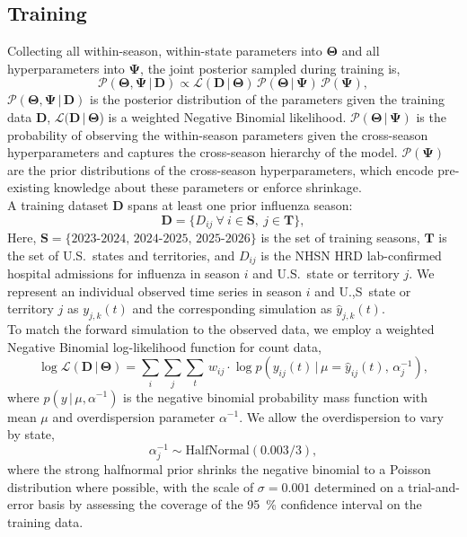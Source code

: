 \documentclass[11pt]{article}
\newcommand{\given}{\,|\,}
\newcommand{\HalfNormal}{\text{HalfNormal}}
\begin{document}
\subsection{Training}
 
Collecting all within-season, within-state parameters into $\bm{\Theta}$ and all hyperparameters into $\bm{\Psi}$, the joint posterior sampled during training is,
\begin{equation}
    \mathcal{P}(\bm{\Theta}, \bm{\Psi} \given \bm{D}) \propto \mathcal{L}(\bm{D} \given \bm{\Theta})\, \mathcal{P}(\bm{\Theta} \given \bm{\Psi})\, \mathcal{P}(\bm{\Psi}),
\end{equation}
$\mathcal{P}(\bm{\Theta}, \bm{\Psi} \given \bm{D})$ is the posterior distribution of the parameters given the training data $\bm{D}$, $\mathcal{L}(\bm{D} \given \bm{\Theta}$) is a weighted Negative Binomial likelihood. $\mathcal{P}\left( \bm{\Theta} \given \bm{\Psi} \right)$ is the probability of observing the within-season parameters given the cross-season hyperparameters and captures the cross-season hierarchy of the model. $\mathcal{P} \left(\bm{\Psi} \right)$ are the prior distributions of the cross-season hyperparameters, which encode pre-existing knowledge about these parameters or enforce shrinkage.\\

A training dataset $\bm{D}$ spans at least one prior influenza season:
\begin{equation}
    \bm{D} = \bigl\{ D_{ij}\ \forall\ i \in \bm{S},\ j \in \bm{T} \bigr\},
\end{equation}
Here, $\bm{S} = \{2023\text{-}2024,\, 2024\text{-}2025,\, 2025\text{-}2026\}$ is the set of training seasons, $\bm{T}$ is the set of U.S.\ states and territories, and $D_{ij}$ is the NHSN HRD lab-confirmed hospital admissions for influenza in season $i$ and U.S.\ state or territory $j$. We represent an individual observed time series in season $i$ and U.,S\ state or territory $j$ as $y_{j,k}(t)$ and the corresponding simulation as $\hat{y}_{j,k}(t)$.\\
 
 
To match the forward simulation to the observed data, we employ a weighted Negative Binomial log-likelihood function for count data, 
\begin{equation}
    \log \mathcal{L}(\bm{D} \given \bm{\Theta}) = \sum_{i}\sum_{j}\sum_{t}\, w_{ij} \cdot \log p \!\left(y_{ij}(t) \given \mu = \hat{y}_{ij}(t),\, \alpha^{-1}_{j}\right),
\end{equation}
where $p(y \given \mu, \alpha^{-1})$ is the negative binomial probability mass function with mean $\mu$ and overdispersion parameter $\alpha^{-1}$. We allow the overdispersion to vary by state,
\begin{equation}
    \alpha^{-1}_j \sim \HalfNormal\! \left( 0.003/3 \right),
\end{equation}
where the strong halfnormal prior shrinks the negative binomial to a Poisson distribution where possible, with the scale of $\sigma=0.001$ determined on a trial-and-error basis by assessing the coverage of the 95~\% confidence interval on the training data.\\
\end{document}
